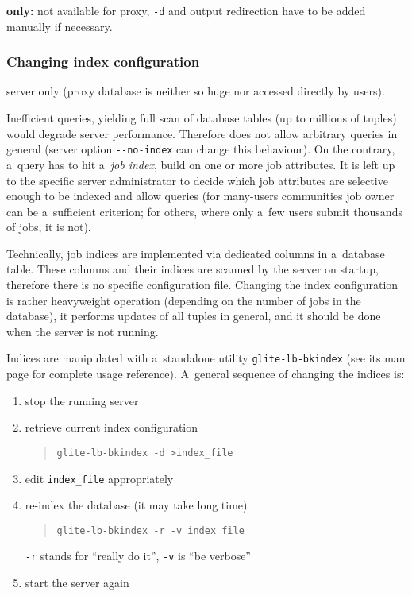 \textbf{ only:} not available for \LB proxy, \verb'-d' and output redirection
have to be added manually if necessary.

\subsubsection{Changing index configuration}
\label{maintain:index}

\LB server only (\LB proxy database is neither so huge nor accessed directly by users).

Inefficient queries, yielding full scan of \LB database tables (up to millions of tuples) would degrade server performance.
Therefore \LB does not allow arbitrary queries in general
(server option \verb'--no-index' can change this behaviour).
On the contrary, a~query has to hit a~\emph{job index}, build on one or
more job attributes.
It is left up to the specific \LB server administrator to decide
which job attributes are selective enough to be indexed and allow queries
(\eg for many-users communities job owner can be a~sufficient criterion;
for others, where only a~few users submit thousands of jobs, it is not).

Technically, job indices are implemented via dedicated columns
in a~database table.
These columns and their indices are scanned by the \LB server on startup,
therefore there is no specific configuration file.
Changing the index configuration is rather heavyweight operation
(depending on the number of jobs in the database), it performs
updates of all tuples in general, and it should be done when the server is not
running.

Indices are manipulated with a~standalone utility \verb'glite-lb-bkindex'
(see its man page for complete usage reference).
A~general sequence of changing the indices is:
\begin{enumerate}
\item stop the running server
\item retrieve current index configuration
\begin{quote}
\verb'glite-lb-bkindex -d >index_file'
\end{quote}
\item edit \verb'index_file' appropriately
\item re-index the database (it may take long time)
\begin{quote}
\verb'glite-lb-bkindex -r -v index_file'
\end{quote}
\verb'-r' stands for ``really do it'', \verb'-v' is ``be verbose''
\item start the server again
\end{enumerate}

